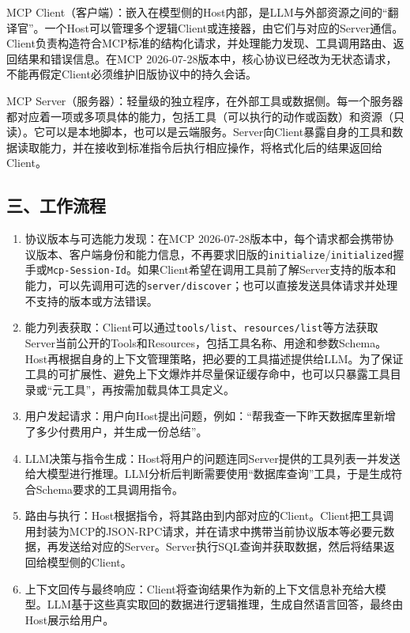 MCP Client（客户端）：嵌入在模型侧的Host内部，是LLM与外部资源之间的``翻译官''。一个Host可以管理多个逻辑Client或连接器，由它们与对应的Server通信。Client负责构造符合MCP标准的结构化请求，并处理能力发现、工具调用路由、返回结果和错误信息。在MCP 2026-07-28版本中，核心协议已经改为无状态请求，不能再假定Client必须维护旧版协议中的持久会话。

MCP Server（服务器）：轻量级的独立程序，在外部工具或数据侧。每一个服务器都对应着一项或多项具体的能力，包括工具（可以执行的动作或函数）和资源（只读）。它可以是本地脚本，也可以是云端服务。Server向Client暴露自身的工具和数据读取能力，并在接收到标准指令后执行相应操作，将格式化后的结果返回给Client。

\hypertarget{ux4e09ux5de5ux4f5cux6d41ux7a0b}{%
\subsection{三、工作流程}\label{ux4e09ux5de5ux4f5cux6d41ux7a0b}}

\begin{enumerate}
\def\labelenumi{\arabic{enumi}.}
\item
  协议版本与可选能力发现：在MCP 2026-07-28版本中，每个请求都会携带协议版本、客户端身份和能力信息，不再要求旧版的\texttt{initialize}/\texttt{initialized}握手或\texttt{Mcp-Session-Id}。如果Client希望在调用工具前了解Server支持的版本和能力，可以先调用可选的\texttt{server/discover}；也可以直接发送具体请求并处理不支持的版本或方法错误。
\item
  能力列表获取：Client可以通过\texttt{tools/list}、\texttt{resources/list}等方法获取Server当前公开的Tools和Resources，包括工具名称、用途和参数Schema。Host再根据自身的上下文管理策略，把必要的工具描述提供给LLM。为了保证工具的可扩展性、避免上下文爆炸并尽量保证缓存命中，也可以只暴露工具目录或``元工具''，再按需加载具体工具定义。
\item
  用户发起请求：用户向Host提出问题，例如：``帮我查一下昨天数据库里新增了多少付费用户，并生成一份总结''。
\item
  LLM决策与指令生成：Host将用户的问题连同Server提供的工具列表一并发送给大模型进行推理。LLM分析后判断需要使用``数据库查询''工具，于是生成符合Schema要求的工具调用指令。
\item
  路由与执行：Host根据指令，将其路由到内部对应的Client。Client把工具调用封装为MCP的JSON-RPC请求，并在请求中携带当前协议版本等必要元数据，再发送给对应的Server。Server执行SQL查询并获取数据，然后将结果返回给模型侧的Client。
\item
  上下文回传与最终响应：Client将查询结果作为新的上下文信息补充给大模型。LLM基于这些真实取回的数据进行逻辑推理，生成自然语言回答，最终由Host展示给用户。
\end{enumerate}

